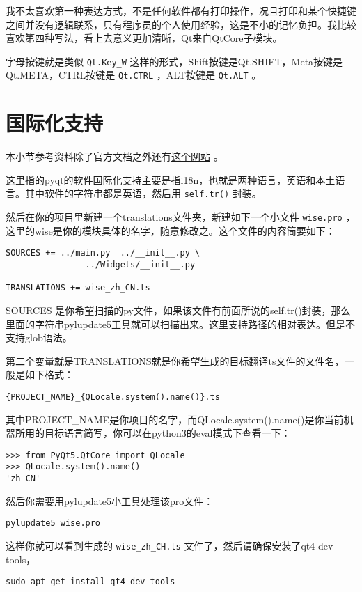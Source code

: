 \documentclass[11pt,oneside]{article}
\begin{document}
我不太喜欢第一种表达方式，不是任何软件都有打印操作，况且打印和某个快捷键之间并没有逻辑联系，只有程序员的个人使用经验，这是不小的记忆负担。我比较喜欢第四种写法，看上去意义更加清晰，Qt来自QtCore子模块。

字母按键就是类似 \texttt{Qt.Key\_W} 这样的形式，Shift按键是Qt.SHIFT，Meta按键是Qt.META，CTRL按键是 \texttt{Qt.CTRL} ，ALT按键是 \texttt{Qt.ALT} 。

\section{国际化支持}
\label{sec:orgheadline45}
本小节参考资料除了官方文档之外还有\href{http://plashless.wordpress.com/2014/02/01/internationalizing-python-pyqt-apps/}{这个网站} 。

这里指的pyqt的软件国际化支持主要是指i18n，也就是两种语言，英语和本土语言。其中软件的字符串都是英语，然后用 \texttt{self.tr()} 封装。

然后在你的项目里新建一个translations文件夹，新建如下一个小文件 \texttt{wise.pro} ，这里的wise是你的模块具体的名字，随意修改之。这个文件的内容简要如下：
\begin{Verbatim}
SOURCES += ../main.py  ../__init__.py \
                ../Widgets/__init__.py

TRANSLATIONS += wise_zh_CN.ts
\end{Verbatim}

SOURCES 是你希望扫描的py文件，如果该文件有前面所说的self.tr()封装，那么里面的字符串pylupdate5工具就可以扫描出来。这里支持路径的相对表达。但是不支持glob语法。

第二个变量就是TRANSLATIONS就是你希望生成的目标翻译ts文件的文件名，一般是如下格式：
\begin{Verbatim}
{PROJECT_NAME}_{QLocale.system().name()}.ts
\end{Verbatim}

其中PROJECT\_NAME是你项目的名字，而QLocale.system().name()是你当前机器所用的目标语言简写，你可以在python3的eval模式下查看一下：
\begin{Verbatim}
>>> from PyQt5.QtCore import QLocale
>>> QLocale.system().name()
'zh_CN'
\end{Verbatim}


然后你需要用pylupdate5小工具处理该pro文件：
\begin{verbatim}
pylupdate5 wise.pro
\end{verbatim}


这样你就可以看到生成的 \texttt{wise\_zh\_CH.ts} 文件了，然后请确保安装了qt4-dev-tools，
\begin{verbatim}
sudo apt-get install qt4-dev-tools
\end{verbatim}
\end{document}
